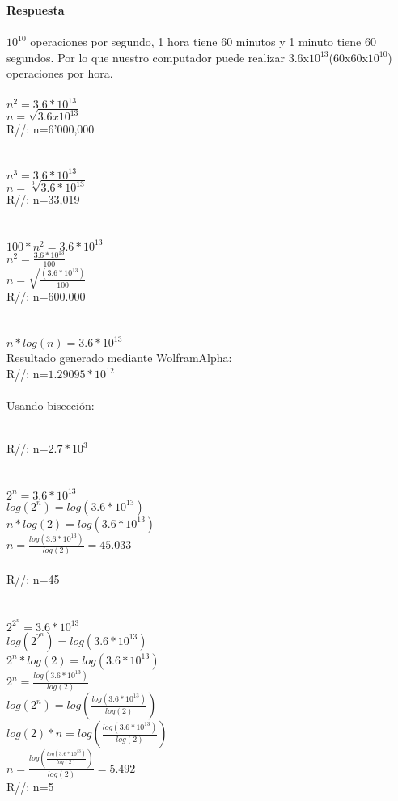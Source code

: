 \documentclass[a4paper,12pt]{article}
\begin{document}
\textbf{Respuesta}\\\\
$10^{10}$ operaciones por segundo, 1 hora tiene 60 minutos y 1 minuto tiene 60 segundos. Por lo que nuestro computador puede realizar 3.6x$10^{13}$(60x60x$10^{10}$) operaciones por hora.\\\\
$n^2 = 3.6*10^{13}$\\
$n =\sqrt{ 3.6x10^{13}}$\\
R//: n=6'000,000 \\\\\\
$n^3 = 3.6*10^{13}$\\
$n = \sqrt[3]{3.6*10^{13}}$\\
R//: n=33,019\\\\\\
$100*n^2 = 3.6*10^{13}$ \\
$n^2 = \frac{3.6*10^{13}}{100}$\\
$n = \sqrt{\frac{(3.6*10^{13})}{100}}$\\
R//: n=600.000\\\\\\
$n*log(n)= 3.6*10^{13}$\\
Resultado generado mediante WolframAlpha:\\
R//: n=$1.29095*10^{12}$\\\\
Usando bisección:

\cite{liori}\\
R//: n=$2.7*10^3$\\\\\\
$2^n = 3.6*10^{13}$ \\ 
$log(2^n) = log(3.6*10^{13})$\\
$n*log(2) = log(3.6*10^{13})$\\
$n = \frac{log(3.6*10^{13})}{log(2)} = 45.033$\\\\
R//: n=45\\\\\\
$2^{2^n} = 3.6*10^{13}$\\
$log(2^{2^n}) = log(3.6*10^{13})$\\
$2^n*log(2) = log(3.6*10^{13})$\\
$2^n = \frac{log(3.6*10^{13})}{log(2)}$\\
$log(2^n) = log(\frac{log(3.6*10^{13})}{log(2)})$\\
$log(2)*n = log(\frac{log(3.6*10^{13})}{log(2)})$\\
$n = \frac{log(\frac{log(3.6*10^{13})}{log(2)})}{log(2)} = 5.492$\\
R//: n=5\\\\
\end{document}
